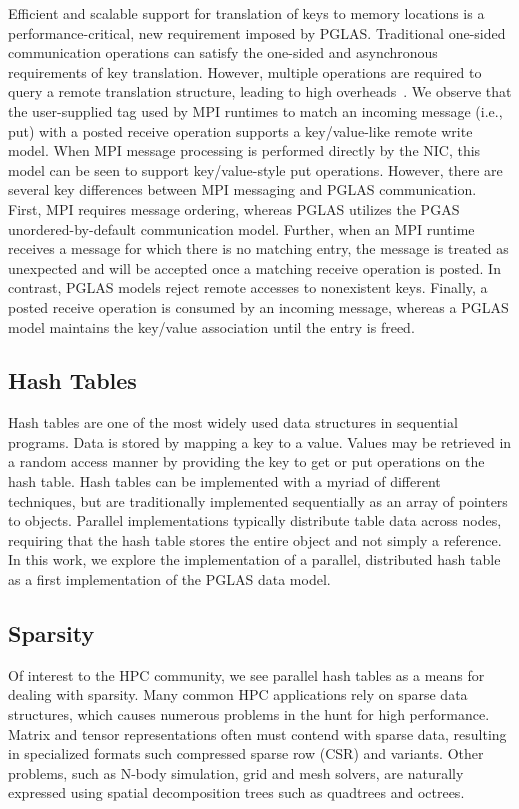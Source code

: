 Efficient and scalable support for translation of keys to memory locations is a
performance-critical, new requirement imposed by PGLAS.  Traditional one-sided
communication operations can satisfy the one-sided and asynchronous
requirements of key translation.  However, multiple operations are required to
query a remote translation structure, leading to high overheads~\cite{namashivayam:15}.  We observe
that the user-supplied tag used by MPI runtimes to match an incoming message
(i.e., put) with a posted receive operation supports a key/value-like remote
write model.  When MPI message processing is performed directly by the NIC,
this model can be seen to support key/value-style put operations.  However,
there are several key differences between MPI messaging and PGLAS
communication.  First, MPI requires message ordering, whereas PGLAS utilizes
the PGAS unordered-by-default communication model.  Further, when an MPI
runtime receives a message for which there is no matching entry, the message is
treated as unexpected and will be accepted once a matching receive operation is
posted.  In contrast, PGLAS models reject remote accesses to nonexistent keys.
Finally, a posted receive operation is consumed by an incoming message, whereas
a PGLAS model maintains the key/value association until the entry is freed.

\subsection{Hash Tables}

Hash tables are one of the most widely used data
structures in sequential programs. Data is stored by mapping a key to
a value. Values may be retrieved in a random access manner by
providing the key to get or put operations on the hash table.
%
Hash tables can be implemented with a myriad of different techniques,
but are traditionally implemented sequentially as an array of pointers
to objects. Parallel implementations typically distribute table data
across nodes, requiring that the hash table stores the entire object
and not simply a reference.
%
In this work, we explore the implementation of a parallel, distributed hash
table as a first implementation of the PGLAS data model.

\subsection{Sparsity}
Of interest to the HPC community, we see parallel hash tables as a
means for dealing with sparsity. Many common HPC applications rely on
sparse data structures, which causes numerous problems in the hunt for
high performance. Matrix and tensor representations often must contend
with sparse data, resulting in specialized formats such compressed
sparse row (CSR) and variants. Other problems, such as N-body
simulation, grid and mesh solvers, are naturally expressed using
spatial decomposition trees such as quadtrees and octrees. 

